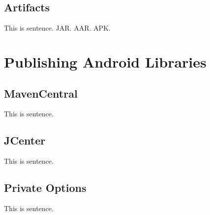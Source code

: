 \subsection{Artifacts}
This is sentence.
JAR.
AAR.
APK.

\section{Publishing Android Libraries}
\subsection{MavenCentral}
This is sentence.

\subsection{JCenter}
This is sentence.

\subsection{Private Options}
This is sentence.

